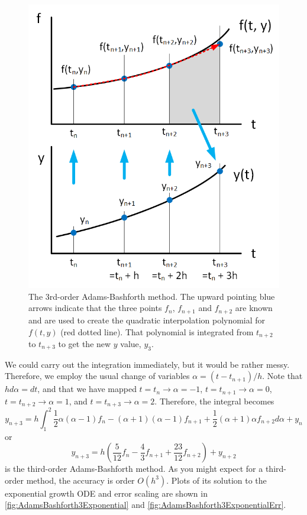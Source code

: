 \documentclass[hidelinks,notitlepage]{book}
\begin{document}
\begin{figure}[tbh]
	\centering
	\includegraphics[width=0.7\columnwidth]{AdamsBashforth3.png}
	\caption{The 3rd-order Adams-Bashforth method.  The upward pointing blue arrows indicate that the three points $f_n$, $f_{n+1}$ and $f_{n+2}$ are known and are used to create the quadratic interpolation polynomial for $f(t,y)$ (red dotted line).  That polynomial is integrated from $t_{n+2}$ to $t_{n+3}$ to get the new $y$ value, $y_3$.}
	\label{fig:AdamsBashforth3}
\end{figure}
We could carry out the integration immediately, but it would be rather messy.  Therefore, we employ the usual change of variables $\alpha = (t - t_{n+1})/h$.  Note that $h d\alpha = dt$, and that we have mapped $t = t_{n} \rightarrow \alpha = -1$, $t = t_{n+1} \rightarrow \alpha = 0$, $t = t_{n+2} \rightarrow \alpha = 1$, and $t = t_{n+3} \rightarrow \alpha = 2$.  Therefore, the integral becomes
 \begin{equation}
 \nonumber
 y_{n+3} = h \int_{1}^{2} 
\frac{1}{2} \alpha(\alpha-1) f_{n}
 -(\alpha+1)(\alpha-1) f_{n+1}
 +\frac{1}{2} (\alpha+1)\alpha f_{n+2}
 d\alpha
 + y_n
 \end{equation}
 or
  \begin{equation}
  \label{eq:AdamsBashforth3}
 y_{n+3} =
h \left(
\frac{5}{12} f_{n}
-\frac{4}{3} f_{n+1}
+\frac{23}{12} f_{n+2}
\right)
 + y_{n+2}
 \end{equation}
 is the third-order Adams-Bashforth method.  As you might expect for a third-order method, the accuracy is order $O(h^3)$.  Plots of its solution to the exponential growth ODE and error scaling are shown in \cref{fig:AdamsBashforth3Exponential} and \cref{fig:AdamsBashforth3ExponentialErr}.
\end{document}
